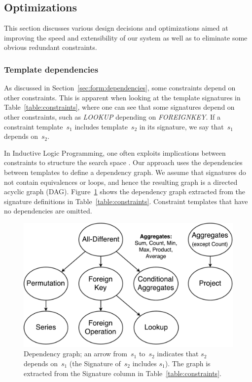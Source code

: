 \documentclass{IEEEtran}
\newcommand{\CSignature}{Signature\xspace}
\theoremstyle{definition}
\begin{document}
\subsection{Optimizations} \label{sec:opts}
This section discusses various design decisions and optimizations aimed at improving the speed and extensibility of our system as well as to eliminate some obvious redundant constraints.

\subsubsection{Template dependencies}
As discussed in Section~\ref{sec:form:dependencies}, some constraints depend on other constraints.
This is apparent when looking at the template signatures in Table~\ref{table:constraints}, where one can see that some signatures depend on other constraints, such as \textit{LOOKUP} depending on \textit{FOREIGNKEY}.
If a constraint template~$s_1$ includes template~$s_2$ in its signature, we say that~$s_1$ depends on~$s_2$.

In Inductive Logic Programming, one often exploits implications between constraints to structure the search space \cite{luc_book}.
Our approach uses the dependencies between templates to define a dependency graph.
We assume that signatures do not contain equivalences or loops, and hence the resulting graph is a directed acyclic graph (DAG).
Figure~\ref{fig:learning_order} shows the dependency graph extracted from the signature definitions in Table~\ref{table:constraints}. 
Constraint templates that have no dependencies are omitted.

\begin{figure}[t]
  \centering
  \includegraphics[width=0.8\linewidth]{figures/constraint_dependency2.pdf}
  \caption{Dependency graph; an arrow from~$s_1$ to~$s_2$ indicates that $s_2$ depends on~$s_1$ (the \CSignature of~$s_2$ includes $s_1$).
    The graph is extracted from the Signature column in Table~\ref{table:constraints}.
  }
  \label{fig:learning_order}
\end{figure}
\end{document}
